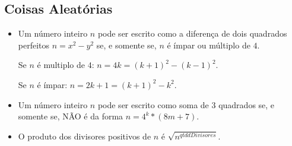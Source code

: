 \documentclass[12pt]{article}
\begin{document}
\subsection*{Coisas Aleatórias}

\begin{itemize}
\item Um número inteiro $n$ pode ser escrito como a diferença de dois quadrados perfeitos $n = x^2-y^2$ se, e somente se, $n$ é ímpar ou múltiplo de $4$.

Se $n$ é multiplo de $4$: $n = 4k = (k+1)^2 - (k-1)^2$.

Se $n$ é ímpar: $n = 2k+1 = (k+1)^2 - k^2$.


\item Um número inteiro $n$ pode ser escrito como soma de $3$ quadrados se, e somente se, NÃO é da forma $n = 4^k*(8m+7)$.


\item O produto dos divisores positivos de $n$ é $\sqrt{n ^ {qtddDivisores}}$.

\end{itemize}





\end{document}
